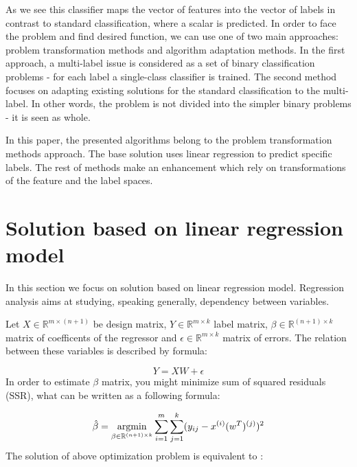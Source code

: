 As we see this classifier maps the vector of features into the vector of labels in contrast to standard classification, where a scalar is predicted. In order to face the problem and find desired function, we can use one of two main approaches: problem transformation methods and algorithm adaptation methods. In the first approach, a multi-label issue is considered as a set of binary classification problems - for each label a single-class classifier is trained. The second method focuses on adapting existing solutions for the standard classification to the multi-label. In other words, the problem is not divided into the simpler binary problems - it is seen as whole.

In this paper, the presented algorithms belong to the problem transformation methods approach. The base solution uses linear regression to predict specific labels. The rest of methods make an enhancement which rely on transformations of the feature and the label spaces. 

\section{Solution based on linear regression model}

In this section we focus on solution based on linear regression model. Regression analysis aims at studying, speaking generally, dependency between variables. 

Let $X \in \mathbb{R}^{m \times  ( n+1 )}$ be design matrix, $Y \in \mathbb{R}^{m \times k}$ label matrix, $\beta \in \mathbb{R}^{(n+1) \times k}$ matrix of coefficents of the regressor and $\epsilon \in \mathbb{R}^{m \times k}$ matrix of errors. The relation between these variables is described by formula:

\begin{equation}\label{eq:LR1}
    Y = XW + \epsilon 
\end{equation}
In order to estimate $\beta$ matrix, you might minimize sum of squared residuals (SSR), what can be written as a following formula:

\begin{equation}\label{eq:LR2}
    \hat{\beta} = \operatorname*{argmin}_{\beta \in \mathbb{R}^{(n+1) \times k}}\sum\limits_{i=1}^{m}\sum\limits_{j=1}^{k}(y_{ij}-x^{(i)}(w^T)^{(j)})^2
\end{equation}
The solution of above optimization problem is equivalent to \cite{Weisberg}:

